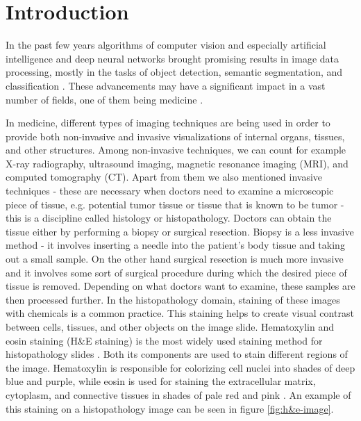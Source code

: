 \chapter{Introduction}
\label{chapter:intro}


In the past few years algorithms of computer vision and especially artificial intelligence and deep neural networks brought promising results in image data processing, mostly in the tasks of object detection, semantic segmentation, and classification \cite{LeCun2015}. These advancements may have a significant impact in a vast number of fields, one of them being medicine \cite{Hu2023, He2023, Wemmert2021}. 

In medicine, different types of imaging techniques are being used in order to provide both non-invasive and invasive visualizations of internal organs, tissues, and other structures. Among non-invasive techniques, we can count for example X-ray radiography, ultrasound imaging, magnetic resonance imaging (MRI), and computed tomography (CT). Apart from them we also mentioned invasive techniques - these are necessary when doctors need to examine a microscopic piece of tissue, e.g. potential tumor tissue or tissue that is known to be tumor - this is a discipline called histology or histopathology. Doctors can obtain the tissue either by performing a biopsy or surgical resection. Biopsy is a less invasive method - it involves inserting a needle into the patient's body tissue and taking out a small sample. On the other hand surgical resection is much more invasive and it involves some sort of surgical procedure during which the desired piece of tissue is removed. Depending on what doctors want to examine, these samples are then processed further. In the histopathology domain, staining of these images with chemicals is a common practice. This staining helps to create visual contrast between cells, tissues, and other objects on the image slide. Hematoxylin and eosin staining (H\&E staining) is the most widely used staining method for histopathology slides \cite{Dey2022}. Both its components are used to stain different regions of the image. Hematoxylin is responsible for colorizing cell nuclei into shades of deep blue and purple, while eosin is used for staining the extracellular matrix, cytoplasm, and connective tissues in shades of pale red and pink \cite{Dey2022}. An example of this staining on a histopathology image can be seen in figure \ref{fig:h&e-image}.

